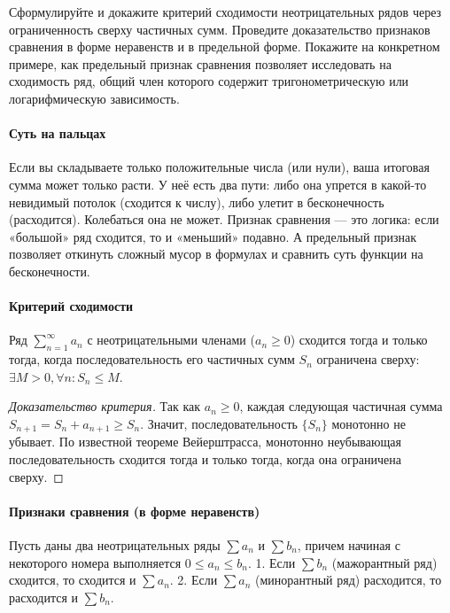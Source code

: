 {Сформулируйте и докажите критерий сходимости неотрицательных рядов через ограниченность сверху частичных сумм. Проведите доказательство признаков сравнения в форме неравенств и в предельной форме. Покажите на конкретном примере, как предельный признак сравнения позволяет исследовать на сходимость ряд, общий член которого содержит тригонометрическую или логарифмическую зависимость.}

\paragraph{Суть на пальцах}
Если вы складываете только положительные числа (или нули), ваша итоговая сумма может только расти. У неё есть два пути: либо она упрется в какой-то невидимый потолок (сходится к числу), либо улетит в бесконечность (расходится). Колебаться она не может. Признак сравнения — это логика: если «большой» ряд сходится, то и «меньший» подавно. А предельный признак позволяет откинуть сложный мусор в формулах и сравнить суть функции на бесконечности.

\paragraph{Критерий сходимости}
Ряд $\sum_{n=1}^\infty a_n$ с неотрицательными членами ($a_n \ge 0$) сходится тогда и только тогда, когда последовательность его частичных сумм $S_n$ ограничена сверху: $\exists M > 0, \forall n : S_n \le M$.

\begin{proof}[Доказательство критерия]
Так как $a_n \ge 0$, каждая следующая частичная сумма $S_{n+1} = S_n + a_{n+1} \ge S_n$. Значит, последовательность $\{S_n\}$ монотонно не убывает. По известной теореме Вейерштрасса, монотонно неубывающая последовательность сходится тогда и только тогда, когда она ограничена сверху.
\end{proof}

\paragraph{Признаки сравнения (в форме неравенств)}
Пусть даны два неотрицательных ряды $\sum a_n$ и $\sum b_n$, причем начиная с некоторого номера выполняется $0 \le a_n \le b_n$.
1. Если $\sum b_n$ (мажорантный ряд) сходится, то сходится и $\sum a_n$.
2. Если $\sum a_n$ (минорантный ряд) расходится, то расходится и $\sum b_n$.

